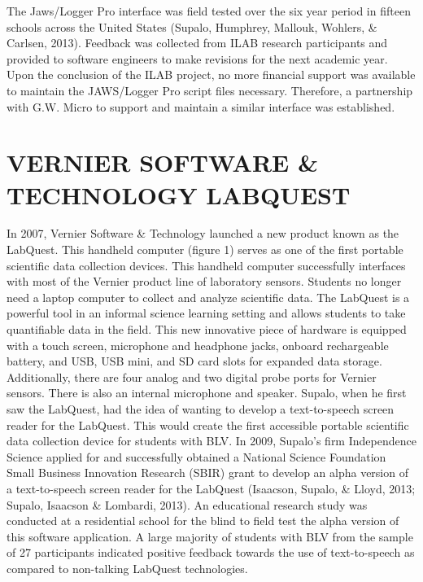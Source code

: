 \documentclass[11.5pt]{sig-alternate} %
\begin{document}
\begin{large}
The Jaws/Logger Pro interface was field tested over the six year period in fifteen schools across the United States (Supalo, Humphrey, Mallouk, Wohlers, \& Carlsen, 2013). Feedback was collected from ILAB research participants and provided to software engineers to make revisions for the next academic year. Upon the conclusion of the ILAB project, no more financial support was available to maintain the JAWS/Logger Pro script files necessary. Therefore, a partnership with G.W. Micro to support and maintain a similar interface was established.

\section*{VERNIER SOFTWARE \& TECHNOLOGY LAB\-QUEST}

In 2007, Vernier Software \& Technology launched a new product known as the LabQuest. This handheld computer (figure 1) serves as one of the first portable scientific data collection devices. This handheld computer successfully interfaces with most of the Vernier product line of laboratory sensors. Students no longer need a laptop computer to collect and analyze scientific data. The LabQuest is a powerful tool in an informal science learning setting and allows students to take quantifiable data in the field. This new innovative piece of hardware is equipped with a touch screen, microphone and headphone jacks, onboard rechargeable battery, and USB, USB mini, and SD card slots for expanded data storage. Additionally, there are four analog and two digital probe ports for Vernier sensors. There is also an internal microphone and speaker. Supalo, when he first saw the LabQuest, had the idea of wanting to develop a text-to-speech screen reader for the LabQuest. This would create the first accessible portable scientific data collection device for students with BLV. In 2009, Supalo’s firm Independence Science applied for and successfully obtained a National Science Foundation Small Business Innovation Research (SBIR) grant to develop an alpha version of a text-to-speech screen reader for the LabQuest (Isaacson, Supalo, \& Lloyd, 2013; Supalo, Isaacson \& Lombardi, 2013). An educational research study was conducted at a residential school for the blind to field test the alpha version of this software application. A large majority of students with BLV from the sample of 27 participants indicated positive feedback towards the use of text-to-speech as compared to non-talking LabQuest technologies.


\end{large}
\end{document}
